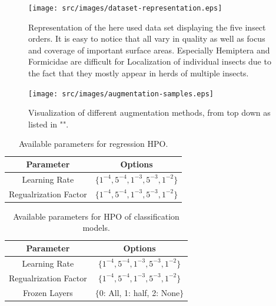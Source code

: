 \begin{figure}[!ht]
    \centering
    \texttt{[image: src/images/dataset-representation.eps]}
    \caption{Representation of the here used data set displaying the five insect orders. It is easy to notice that all vary in quality as well as focus and coverage of important surface areas. Especially Hemiptera and Formicidae are difficult for Localization of individual insects due to the fact that they mostly appear in herds of multiple insects.}
    \label{fig:dataset-overview}
\end{figure}

\begin{figure}[!ht]
    \centering
    \texttt{[image: src/images/augmentation-samples.eps]}
    \caption{Visualization of different augmentation methods, from top down as listed in "".}
    \label{fig:augmentation-samples}
\end{figure}


\begin{table}[!ht]
    \centering
    \begin{tabular}{|c|c|}
        \hline
        \textbf{Parameter} & \textbf{Options} \\
        \hline
        Learning Rate & $\{1^{-4}, 5^{-4}, 1^{-3}, 5^{-3}, 1^{-2}\}$\\
        \hline
        Regualrization Factor & $\{1^{-4}, 5^{-4}, 1^{-3}, 5^{-3}, 1^{-2}\}$\\
        \hline
    \end{tabular}
    \caption{Available parameters for regression HPO.}
    \label{fig:reg-hp-table}
\end{table}
\begin{table}[!ht]
    \centering
    \begin{tabular}{|c|c|}
        \hline
        \textbf{Parameter} & \textbf{Options} \\
        \hline
        Learning Rate & $\{1^{-4}, 5^{-4}, 1^{-3}, 5^{-3}, 1^{-2}\}$\\
        \hline
        Regualrization Factor & $\{1^{-4}, 5^{-4}, 1^{-3}, 5^{-3}, 1^{-2}\}$\\
        \hline
        Frozen Layers & $\{$0: All, 1: half, 2: None$\}$\\
        \hline
    \end{tabular}
    \caption{Available parameters for HPO of classification models.}
    \label{fig:clf-hp-table}
\end{table}

